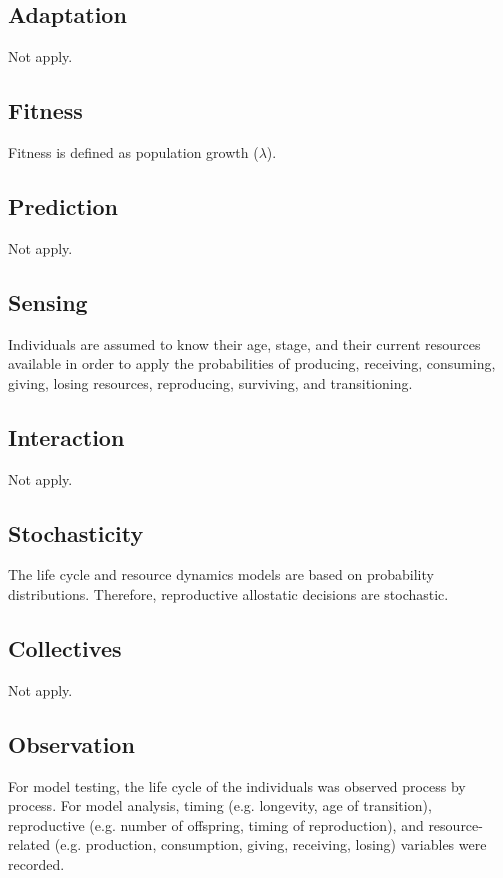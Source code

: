 \documentclass{article}
\begin{document}
\subsection{Adaptation}

Not apply.

\subsection{Fitness}

Fitness is defined as population growth ($\lambda$).

\subsection{Prediction}

Not apply.

\subsection{Sensing}

Individuals are assumed to know their age, stage, and their current resources available  in order to apply the probabilities of producing, receiving, consuming, giving, losing resources, reproducing, surviving, and transitioning.

\subsection{Interaction}

Not apply.

\subsection{Stochasticity}

The life cycle and resource dynamics models are based on probability distributions. Therefore, reproductive allostatic decisions are stochastic.

\subsection{Collectives}

Not apply.

\subsection{Observation}

For model testing, the life cycle of the individuals was observed process by process. For model analysis, timing (e.g. longevity, age of transition), reproductive (e.g. number of offspring, timing of reproduction), and resource-related (e.g. production, consumption, giving, receiving, losing) variables were recorded.
\end{document}
